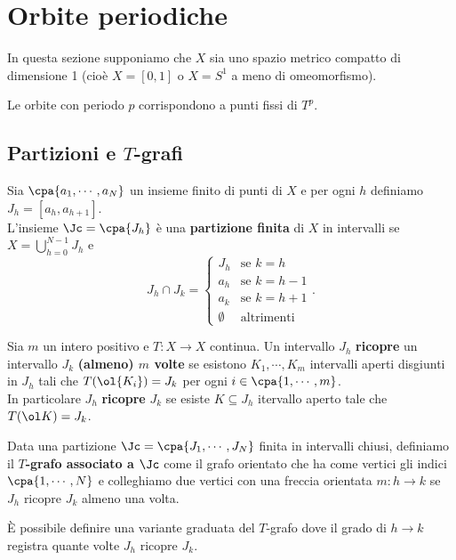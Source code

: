 \chapter{Orbite periodiche}
In questa sezione supponiamo che  $X$ sia uno spazio metrico compatto di dimensione 1 (cio\`e $X=[0,1]$ o $X=S^1$ a meno di omeomorfismo).

\begin{remark}
Le orbite con periodo $p$ corrispondono a punti fissi di $T^p$.
\end{remark}

\section{\texorpdfstring{Partizioni e $T$-grafi}{Partizioni e T-grafi}}
\begin{definition}
Sia $\cpa{a_1,\cdots, a_N}$ un insieme finito di punti di $X$ e per ogni $h$ definiamo $J_h=[a_h,a_{h+1}]$.\\ L'insieme $\Jc=\cpa{J_h}$ \`e una \textbf{partizione finita} di $X$ in intervalli se $X=\bigcup_{h=0}^{N-1}J_h$ e 
\[J_h\cap J_k=\begin{cases}
J_h & \text{se }k=h\\
a_{h} & \text{se }k=h-1\\
a_{k} & \text{se }k=h+1\\
\emptyset &\text{altrimenti}
\end{cases}.\] 
\end{definition}

\begin{definition}
Sia $m$ un intero positivo e $T:X\to X$ continua. Un intervallo $J_h$ \textbf{ricopre} un intervallo $J_k$ \textbf{(almeno) $m$ volte} se esistono $K_1,\cdots, K_m$ intervalli aperti disgiunti in $J_h$ tali che $T(\ol{K_i})=J_k$ per ogni $i\in\cpa{1,\cdots, m}$.\\
In particolare $J_h$ \textbf{ricopre} $J_k$ se esiste $K\subseteq J_h$ itervallo aperto tale che $T(\ol K)=J_k$.
\end{definition}

\begin{definition}
Data una partizione $\Jc=\cpa{J_1,\cdots, J_N}$ finita in intervalli chiusi, definiamo il \textbf{$T$-grafo associato a $\Jc$} come il grafo orientato che ha come vertici gli indici $\cpa{1,\cdots, N}$ e colleghiamo due vertici con una freccia orientata $m:h\to k$ se $J_h$ ricopre $J_k$ almeno una volta.
\end{definition}
\begin{remark}
\`E possibile definire una variante graduata del $T$-grafo dove il grado di $h\to k$ registra quante volte $J_h$ ricopre $J_k$.
\end{remark}

